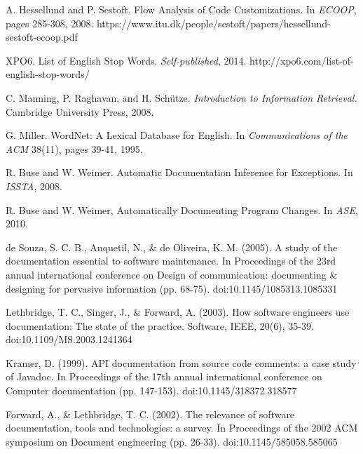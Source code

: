 \documentclass[preprint]{sigplanconf}
\begin{document}




\begin{thebibliography}{}
\softraggedright

A. Hessellund and P. Sestoft. Flow Analysis of Code Customizations. In \emph{ECOOP}, pages 285-308, 2008.
https://www.itu.dk/people/sestoft/papers/hessellund-sestoft-ecoop.pdf

XPO6. List of English Stop Words. \emph{Self-published}, 2014.
http://xpo6.com/list-of-english-stop-words/

C. Manning, P. Raghavan, and H. Schütze. \emph{Introduction to Information Retrieval.} Cambridge University Press, 2008.

G. Miller. WordNet: A Lexical Database for English. In \emph{Communications of the ACM} 38(11), pages 39-41, 1995.

R. Buse and W. Weimer. Automatic Documentation Inference for Exceptions. In \emph{ISSTA}, 2008.

R. Buse and W. Weimer, Automatically Documenting Program Changes. In \emph{ASE}, 2010.

de Souza, S. C. B., Anquetil, N., \& de Oliveira, K. M. (2005). A study of the documentation essential to software maintenance. In Proceedings of the 23rd annual international conference on Design of communication: documenting \& designing for pervasive information (pp. 68-75). doi:10.1145/1085313.1085331

Lethbridge, T. C., Singer, J., \& Forward, A. (2003). How software engineers use documentation: The state of the practice. Software, IEEE, 20(6), 35-39. doi:10.1109/MS.2003.1241364

Kramer, D. (1999). API documentation from source code comments: a case study of Javadoc. In Proceedings of the 17th annual international conference on Computer documentation (pp. 147-153). doi:10.1145/318372.318577

Forward, A., \& Lethbridge, T. C. (2002). The relevance of software documentation, tools and technologies: a survey. In Proceedings of the 2002 ACM symposium on Document engineering (pp. 26-33). doi:10.1145/585058.585065

\end{thebibliography}
\end{document}
